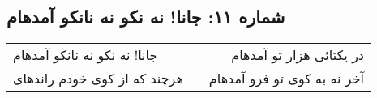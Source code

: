 \begin{center}
\section*{شماره ۱۱: جانا! نه نکو نه نانکو آمدهام}
\label{sec:011}
\begin{longtable}{l p{0.5cm} r}
جانا! نه نکو نه نانکو آمدهام
&&
در یکتائی هزار تو آمدهام
\\
هرچند که از کوی خودم راندهای
&&
آخر نه به کوی تو فرو آمدهام
\\
\end{longtable}
\end{center}
